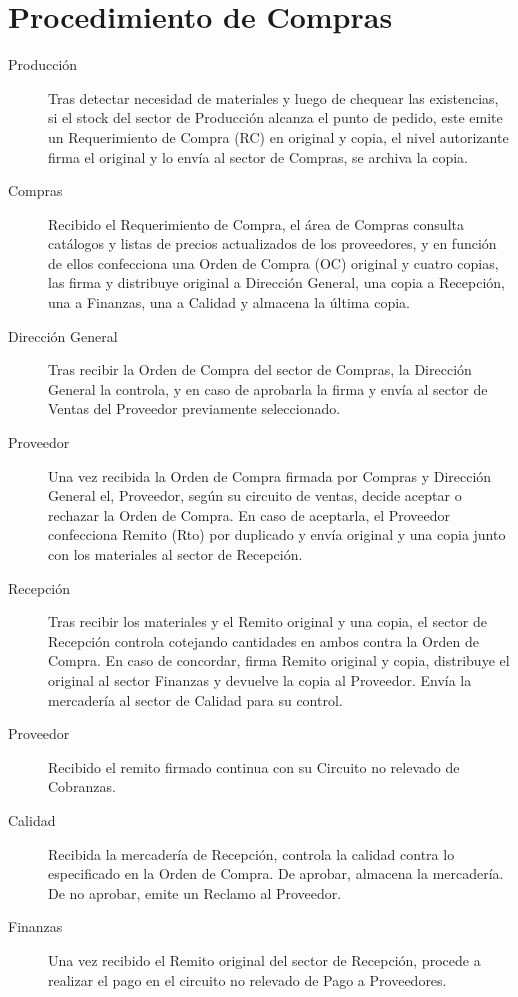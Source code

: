 \section{Procedimiento de Compras}
\begin{description}
\item[Producción] Tras detectar necesidad de materiales y luego de chequear las existencias, si el stock del sector de Producción alcanza el punto de pedido, este emite un Requerimiento de Compra (RC) en original y copia, el nivel autorizante firma el original y lo envía al sector de Compras, se archiva la copia.
\item[Compras] Recibido el Requerimiento de Compra, el área de Compras consulta catálogos y listas de precios actualizados de los proveedores, y en función de ellos confecciona una Orden de Compra (OC) original y cuatro copias, las firma y distribuye original a Dirección General, una copia a Recepción, una a Finanzas, una a Calidad y almacena la última copia.
\item [Dirección General] Tras recibir la Orden de Compra del sector de Compras, la Dirección General la controla, y en caso de aprobarla la firma y envía al sector de Ventas del Proveedor previamente seleccionado.
\item [Proveedor] Una vez recibida la Orden de Compra firmada por Compras y Dirección General el, Proveedor, según su circuito de ventas,  decide aceptar o rechazar la Orden de Compra. En caso de aceptarla, el Proveedor confecciona Remito (Rto) por duplicado y envía original y una copia junto con los materiales al sector de Recepción.
\item[Recepción] Tras recibir los materiales y el Remito original y una copia, el sector de Recepción controla cotejando cantidades en ambos contra la Orden de Compra. En caso de concordar, firma Remito original y copia, distribuye el original al sector Finanzas y devuelve la copia al Proveedor. Envía la mercadería al sector de Calidad para su control.
\item [Proveedor] Recibido el remito firmado continua con su Circuito no relevado de Cobranzas.
\item [Calidad] Recibida la mercadería de Recepción, controla la calidad contra lo especificado en la Orden de Compra. De aprobar, almacena la mercadería. De no aprobar, emite un Reclamo al Proveedor.
\item [Finanzas] Una vez recibido el Remito original del sector de Recepción, procede a realizar el pago en el circuito no relevado de Pago a Proveedores.

\end{description}

